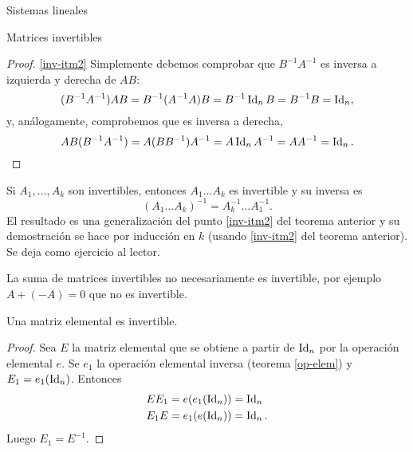 \begin{chapter}{Sistemas lineales}
\begin{section}{Matrices invertibles}
\begin{proof}
                    \ref{inv-itm2} Simplemente debemos comprobar que $B^{-1}A^{-1}$ es inversa a izquierda y derecha de $AB$:
                    \begin{equation*}
                    (B^{-1}A^{-1})AB = B^{-1}(A^{-1}A)B = B^{-1}\operatorname{Id}_nB =B^{-1}B = \operatorname{Id}_n,
                    \end{equation*}
                    y,  análogamente, comprobemos que es inversa a derecha, 
                    \begin{equation*}
                    AB(B^{-1}A^{-1}) = A(BB^{-1})A^{-1} = A\operatorname{Id}_nA^{-1} =AA^{-1} = \operatorname{Id}_n.
                    \end{equation*} 
                \end{proof}
            
            
            \begin{observacion*}
                Si $A_1,\ldots,A_k$  son invertibles,  entonces $A_1\ldots A_k$ es invertible y su inversa es  $$(A_1\ldots A_k)^{-1} = A_k^{-1}\ldots A_1^{-1} .$$
                El resultado es una generalización del punto  \ref{inv-itm2} del teorema anterior y su demostración se hace por inducción en $k$ (usando  \ref{inv-itm2}  del teorema anterior). Se deja como ejercicio al lector. 
            \end{observacion*}
            
            \begin{observacion*}
                La suma de matrices invertibles no necesariamente es invertible, por ejemplo $A+ (-A)= 0$ que no es invertible. 
            \end{observacion*}	
            
            
            \begin{teorema}\label{th-elmental-impl-invertible}
                Una matriz elemental es invertible.
            \end{teorema}
            \begin{proof}
                Sea $E$ la matriz elemental que se obtiene a partir de $\operatorname{Id}_n$ por la operación elemental $e$. Se $e_1$ la operación elemental inversa (teorema \ref{op-elem}) y $E_1 = e_1(\operatorname{Id}_n)$. Entonces 
                \begin{align*}
                EE_1 &= e(e_1(\operatorname{Id}_n)) = \operatorname{Id}_n \\
                E_1E &= e_1(e(\operatorname{Id}_n)) = \operatorname{Id}_n.
                \end{align*}
                Luego  $E_1 = E^{-1}$. 
            \end{proof}	
            

\end{section}
\end{chapter}
